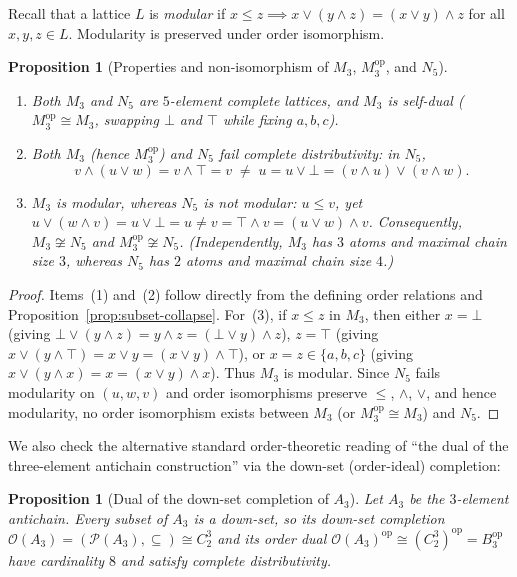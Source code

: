 \documentclass[11pt,a4paper]{article}
\theoremstyle{plain}
\newtheorem{proposition}[theorem]{Proposition}
\theoremstyle{definition}
\newcommand{\op}{\mathrm{op}}
\newcommand{\Down}{\mathcal{O}}
\begin{document}
Recall that a lattice $L$ is \emph{modular} if $x \le z \implies x \vee (y \wedge z) = (x \vee y) \wedge z$
for all $x, y, z \in L$. Modularity is preserved under order isomorphism.

\begin{proposition}[Properties and non-isomorphism of $M_3$, $M_3^{\op}$, and $N_5$]
\label{prop:M3-N5}
\begin{enumerate}
  \item Both $M_3$ and $N_5$ are $5$-element complete lattices, and $M_3$ is self-dual
    ($M_3^{\op} \cong M_3$, swapping $\bot$ and $\top$ while fixing $a, b, c$).
  \item Both $M_3$ (hence $M_3^{\op}$) and $N_5$ fail complete distributivity: in $N_5$,
    \[
      v \wedge (u \vee w) = v \wedge \top = v \;\neq\; u = u \vee \bot = (v \wedge u) \vee (v \wedge w).
    \]
  \item $M_3$ is modular, whereas $N_5$ is not modular: $u \le v$, yet
    $u \vee (w \wedge v) = u \vee \bot = u \neq v = \top \wedge v = (u \vee w) \wedge v$.
    Consequently, $M_3 \not\cong N_5$ and $M_3^{\op} \not\cong N_5$.
    (Independently, $M_3$ has $3$ atoms and maximal chain size $3$, whereas $N_5$ has $2$
    atoms and maximal chain size $4$.)
\end{enumerate}
\end{proposition}

\begin{proof}
Items~(1) and~(2) follow directly from the defining order relations and
Proposition~\ref{prop:subset-collapse}. For~(3), if $x \le z$ in $M_3$, then either
$x = \bot$ (giving $\bot \vee (y \wedge z) = y \wedge z = (\bot \vee y) \wedge z$),
$z = \top$ (giving $x \vee (y \wedge \top) = x \vee y = (x \vee y) \wedge \top$), or
$x = z \in \{a, b, c\}$ (giving $x \vee (y \wedge x) = x = (x \vee y) \wedge x$). Thus
$M_3$ is modular. Since $N_5$ fails modularity on $(u, w, v)$ and order isomorphisms
preserve $\le$, $\wedge$, $\vee$, and hence modularity, no order isomorphism exists
between $M_3$ (or $M_3^{\op} \cong M_3$) and $N_5$.
\end{proof}

We also check the alternative standard order-theoretic reading of ``the dual of the
three-element antichain construction'' via the down-set (order-ideal) completion:

\begin{proposition}[Dual of the down-set completion of $A_3$]
\label{prop:downset-A3}
Let $A_3$ be the $3$-element antichain. Every subset of $A_3$ is a down-set, so its
down-set completion $\Down(A_3) = (\mathcal{P}(A_3), \subseteq) \cong C_2^3$ and its
order dual $\Down(A_3)^{\op} \cong (C_2^3)^{\op} = B_3^{\op}$ have cardinality $8$ and
\emph{satisfy} complete distributivity.
\end{proposition}
\end{document}
